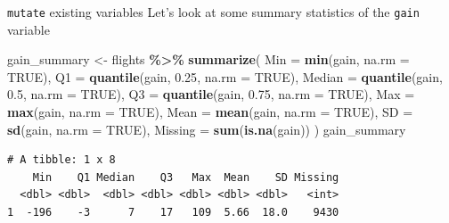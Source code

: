 \documentclass[
  ignorenonframetext,
]{beamer}
\newenvironment{Shaded}{\begin{snugshade}}{\end{snugshade}}
\newcommand{\AttributeTok}[1]{\textcolor[rgb]{0.13,0.29,0.53}{#1}}
\newcommand{\ConstantTok}[1]{\textcolor[rgb]{0.56,0.35,0.01}{#1}}
\newcommand{\FloatTok}[1]{\textcolor[rgb]{0.00,0.00,0.81}{#1}}
\newcommand{\FunctionTok}[1]{\textcolor[rgb]{0.13,0.29,0.53}{\textbf{#1}}}
\newcommand{\NormalTok}[1]{#1}
\newcommand{\OtherTok}[1]{\textcolor[rgb]{0.56,0.35,0.01}{#1}}
\newcommand{\SpecialCharTok}[1]{\textcolor[rgb]{0.81,0.36,0.00}{\textbf{#1}}}
\begin{document}
\begin{frame}[fragile]{\texttt{mutate} existing variables}
\protect\hypertarget{mutate-existing-variables-6}{}
Let's look at some summary statistics of the \texttt{gain} variable

\small

\begin{Shaded}
\begin{Highlighting}[]
\NormalTok{gain\_summary }\OtherTok{\textless{}{-}}\NormalTok{ flights }\SpecialCharTok{\%\textgreater{}\%} 
  \FunctionTok{summarize}\NormalTok{(}
    \AttributeTok{Min =} \FunctionTok{min}\NormalTok{(gain, }\AttributeTok{na.rm =} \ConstantTok{TRUE}\NormalTok{),}
    \AttributeTok{Q1 =} \FunctionTok{quantile}\NormalTok{(gain, }\FloatTok{0.25}\NormalTok{, }\AttributeTok{na.rm =} \ConstantTok{TRUE}\NormalTok{),}
    \AttributeTok{Median =} \FunctionTok{quantile}\NormalTok{(gain, }\FloatTok{0.5}\NormalTok{, }\AttributeTok{na.rm =} \ConstantTok{TRUE}\NormalTok{),}
    \AttributeTok{Q3 =} \FunctionTok{quantile}\NormalTok{(gain, }\FloatTok{0.75}\NormalTok{, }\AttributeTok{na.rm =} \ConstantTok{TRUE}\NormalTok{),}
    \AttributeTok{Max =} \FunctionTok{max}\NormalTok{(gain, }\AttributeTok{na.rm =} \ConstantTok{TRUE}\NormalTok{),}
    \AttributeTok{Mean =} \FunctionTok{mean}\NormalTok{(gain, }\AttributeTok{na.rm =} \ConstantTok{TRUE}\NormalTok{),}
    \AttributeTok{SD =} \FunctionTok{sd}\NormalTok{(gain, }\AttributeTok{na.rm =} \ConstantTok{TRUE}\NormalTok{),}
    \AttributeTok{Missing =} \FunctionTok{sum}\NormalTok{(}\FunctionTok{is.na}\NormalTok{(gain))}
\NormalTok{  )}
\NormalTok{gain\_summary}
\end{Highlighting}
\end{Shaded}

\begin{verbatim}
# A tibble: 1 x 8
    Min    Q1 Median    Q3   Max  Mean    SD Missing
  <dbl> <dbl>  <dbl> <dbl> <dbl> <dbl> <dbl>   <int>
1  -196    -3      7    17   109  5.66  18.0    9430
\end{verbatim}

\normalsize
\end{frame}
\end{document}
